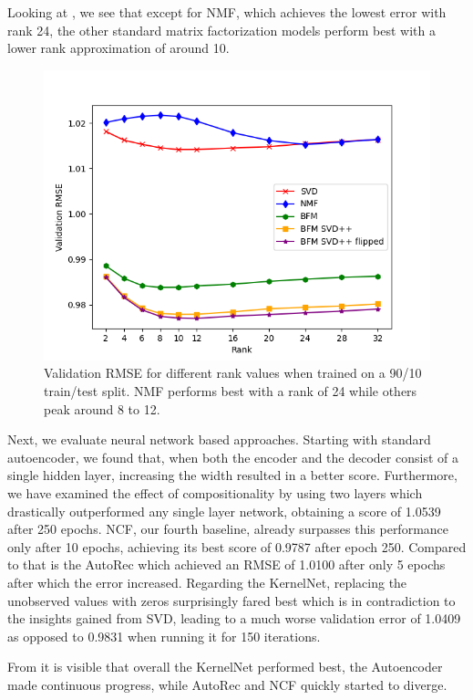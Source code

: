 \documentclass[10pt,conference,compsocconf]{IEEEtran}
\begin{document}
    Looking at , we see that except for NMF, which achieves the lowest error with rank 24, the other standard matrix factorization models perform best with a lower rank approximation of around 10.
    \begin{figure}
        \includegraphics[width=\columnwidth]{figures/rank.png}
        \caption{Validation RMSE for different rank values when trained on a 90/10 train/test split.
        NMF performs best with a rank of 24 while others peak around 8 to 12.}
        \label{fig:rank}
    \end{figure}

    Next, we evaluate neural network based approaches.
    Starting with standard autoencoder, we found that, when both the encoder and the decoder consist of a single hidden layer, increasing the width resulted in a better score.
    Furthermore, we have examined the effect of compositionality by using two layers which drastically outperformed any single layer network, obtaining a score of 1.0539 after 250 epochs.
    NCF, our fourth baseline, already surpasses this performance only after 10 epochs, achieving its best score of 0.9787 after epoch 250.
    Compared to that is the AutoRec which achieved an RMSE of 1.0100 after only 5 epochs after which the error increased.
    Regarding the KernelNet, replacing the unobserved values with zeros surprisingly fared best which is in contradiction to the insights gained from SVD, leading to a much worse validation error of 1.0409 as opposed to 0.9831 when running it for 150 iterations.

    From  it is visible that overall the KernelNet performed best, the Autoencoder made continuous progress, while AutoRec and NCF quickly started to diverge.
\end{document}
